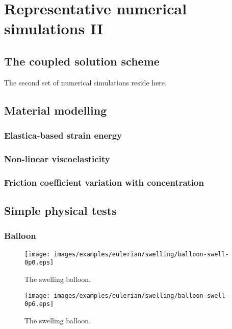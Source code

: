 \chapter{Representative numerical simulations II}
\label{numerical-simulations-2}

\section{The coupled solution scheme}
\label{coupled-solution-scheme-2}

The second set of numerical simulations reside here.

\section{Material modelling}
\label{material-modelling}

\subsection{Elastica-based strain energy}
\label{elastica-stain-energy}

\subsection{Non-linear viscoelasticity}
\label{non-linear-viscoelasticity}

\subsection{Friction coefficient variation with concentration}
\label{variable-friction-coefficient}

\section{Simple physical tests}
\label{simple-physics}

\subsection{Balloon}
\label{balloon}

\begin{figure}
\centering
{\texttt{[image: images/examples/eulerian/swelling/balloon-swell-0p0.eps]}}
\caption{The swelling balloon.} 
\label{swelling-balloon-image-0}
\end{figure}

\begin{figure}
\centering
{\texttt{[image: images/examples/eulerian/swelling/balloon-swell-0p6.eps]}}
\caption{The swelling balloon.} 
\label{swelling-balloon-image-1}
\end{figure}

